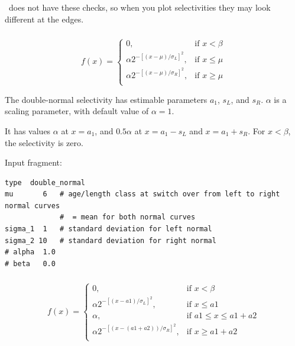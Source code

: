 \CNAME\ does not have these checks, so when you plot selectivities they may look different at the edges.

\subsubsection[Double normal]{}  \label{sec:Selectivity-DoubleNormal}

\begin{equation}
  f(x) = \begin{cases}
     0, & \text{if $x < \beta$} \\
    \alpha 2^{-[(x- \mu)/\sigma_L ]^2}, & \text{if $x \leq \mu$} \\
    \alpha 2^{-[(x- \mu)/\sigma_R ]^2}, & \text{if $x \ge \mu$}\\
  \end{cases}
\end{equation}

The double-normal selectivity has estimable parameters $a_1$, $s_L$, and $s_R$. $\alpha$ is a scaling parameter, with default value of $\alpha = 1$. 

It has values $\alpha$ at $x=a_1$, and $0.5 \alpha$ at $x=a_1-s_L$ and $x=a_1+s_R$. For $x < \beta$, the selectivity is zero.

Input fragment: {\small{\begin{verbatim}
type  double_normal
mu       6   # age/length class at switch over from left to right normal curves
             #  = mean for both normal curves
sigma_1  1   # standard deviation for left normal
sigma_2 10   # standard deviation for right normal
# alpha  1.0
# beta   0.0
\end{verbatim}}}

\subsubsection[Double normal plateau]{}  \label{sec:Selectivity-DoubleNormalPlateau}

\begin{equation}
f(x) = \begin{cases}
0, & \text{if $x < \beta$} \\
\alpha 2^{-[(x- a1)/\sigma_L ]^2}, & \text{if $x \leq a1$} \\
\alpha, 							& \text{if $a1 \le x \leq a1 + a2 $}\\
\alpha 2^{-[(x- (a1 + a2))/\sigma_R ]^2}, & \text{if $x \ge a1 + a2 $}\\
\end{cases}
\end{equation}

